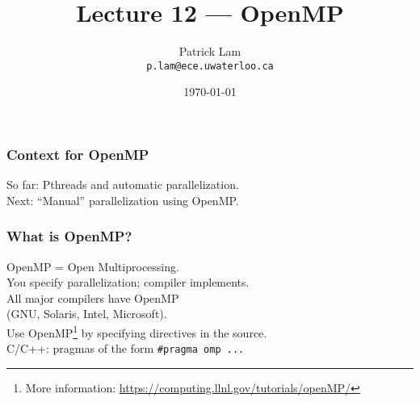 

\title{Lecture 12 --- OpenMP }

\author{Patrick Lam \\ \small \texttt{p.lam@ece.uwaterloo.ca}}
\date{\today}




\begin{frame}
  \titlepage

 \end{frame}

\begin{frame}[containsverbatim]
  \frametitle{Context for OpenMP}

  
    So far: Pthreads and automatic parallelization.\\[1em]
    Next: ``Manual'' parallelization using OpenMP.
  
\end{frame}

\begin{frame}[containsverbatim]
  \frametitle{What is OpenMP?}

  
    OpenMP = Open Multiprocessing.\\[2em]
    You specify parallelization; compiler implements.\\[1em]
    All major compilers have OpenMP \\
    \qquad (GNU, Solaris,
      Intel, Microsoft).\\[1em]

  Use OpenMP\footnote{More information:
    \url{https://computing.llnl.gov/tutorials/openMP/}} by specifying
  directives in the source. \\[1em]
  C/C++: pragmas of the
  form \verb+#pragma omp ...+
  
\end{frame}


